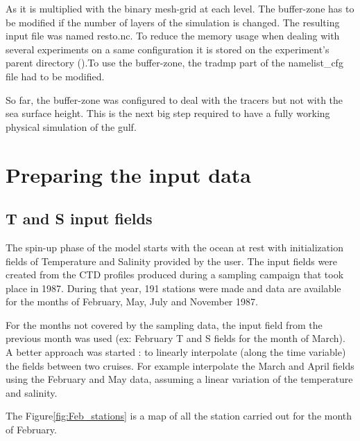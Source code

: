 \documentclass[english]{PFeENSTA}
\begin{document}
{As it is multiplied with the binary mesh-grid at each level. The buffer-zone has to be modified if the number of layers of the simulation is changed. 
The resulting input file was named resto.nc. To reduce the memory usage when dealing with several experiments on a same configuration it is stored on the experiment's parent directory ().To use the buffer-zone, the tradmp part of the namelist\_cfg file had to be modified.


So far, the buffer-zone was configured to deal with the tracers but not with the sea surface height. This is the next big step required to have a fully working physical simulation of the gulf. %


\chapter{Preparing the input data}

\section{T and S input fields}

The spin-up phase of the model starts with the ocean at rest with initialization fields of Temperature and Salinity provided by the user. 
The input fields were created from the CTD profiles produced during a sampling campaign that took place in 1987. During that year, 191 stations were made and data are available for the months of February, May, July and November 1987. 

For the months not covered by the sampling data, the input field from the previous month was used (ex: February T and S fields for the month of March). A better approach was started : to linearly interpolate (along the time variable) the fields between two cruises. For example interpolate the March and April fields using the February and May data, assuming a linear variation of the temperature and salinity. 



The Figure\ref{fig:Feb_stations} is a map of all the station carried out for the month of February. 



}
\end{document}
